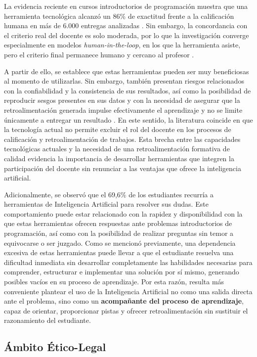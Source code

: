 \documentclass[letterpaper, 10 pt, conference]{ieeeconf}
\begin{document}
La evidencia reciente en cursos introductorios de programación muestra que una herramienta tecnológica alcanzó un 86\% de exactitud frente a la calificación humana en más de 6.000 entregas analizadas \cite{23}. Sin embargo, la concordancia con el criterio real del docente es solo moderada, por lo que la investigación converge especialmente en modelos \textit{human-in-the-loop}, en los que la herramienta asiste, pero el criterio final permanece humano y cercano al profesor \cite{8}\cite{21}. 

A partir de ello, se establece que estas herramientas pueden ser muy beneficiosas al momento de utilizarlas. Sin embargo, también presentan riesgos relacionados con la confiabilidad y la consistencia de sus resultados, así como la posibilidad de reproducir sesgos presentes en sus datos y con la necesidad de asegurar que la retroalimentación generada impulse efectivamente el aprendizaje y no se limite únicamente a entregar un resultado \cite{13}. En este sentido, la literatura coincide en que la tecnología actual no permite excluir el rol del docente en los procesos de calificación y retroalimentación de trabajos. Esta brecha entre las capacidades tecnológicas actuales y la necesidad de una retroalimentación formativa de calidad evidencia la importancia de desarrollar herramientas que integren la participación del docente sin renunciar a las ventajas que ofrece la inteligencia artificial.

Adicionalmente, se observó que el 69,6\% de los estudiantes recurría a herramientas de Inteligencia Artificial para resolver sus dudas. Este comportamiento puede estar relacionado con la rapidez y disponibilidad con la que estas herramientas ofrecen respuestas ante problemas introductorios de programación, así como con la posibilidad de realizar preguntas sin temor a equivocarse o ser juzgado. Como se mencionó previamente, una dependencia excesiva de estas herramientas puede llevar a que el estudiante resuelva una dificultad inmediata sin desarrollar completamente las habilidades necesarias para comprender, estructurar e implementar una solución por sí mismo, generando posibles vacíos en su proceso de aprendizaje. Por esta razón, resulta más conveniente plantear el uso de la Inteligencia Artificial no como una salida directa ante el problema, sino como un \textbf{acompañante del proceso de aprendizaje}, capaz de orientar, proporcionar pistas y ofrecer retroalimentación sin sustituir el razonamiento del estudiante.


\subsection{Ámbito Ético-Legal}  
\end{document}
